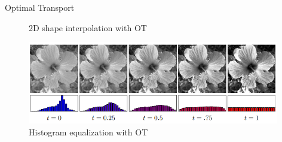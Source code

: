 \begin{frame}{Optimal Transport}
\begin{figure}
\begin{minipage}[t]{0.38\linewidth}
            \caption{2D shape interpolation with OT}
            \includegraphics[width=0.98\textwidth]{png/HistogramEqualization.png}
            \caption{Histogram equalization with OT}
        \end{minipage}
    \end{figure}
\end{frame}